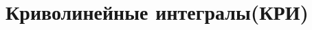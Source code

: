 \documentclass[../main.tex]{subfiles}
\begin{document}
 \chapter{Криволинейные интегралы(КРИ)}
 
\end{document}
